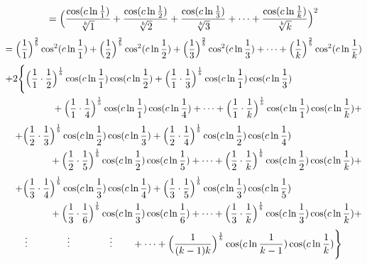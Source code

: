 \documentclass{amsart}
\begin{document}
	\[ = \Bigl( \frac{\cos({c\ln \frac{1}{1}})}{\sqrt[b]{1}} + \frac{\cos({c\ln \frac{1}{2}})}{\sqrt[b]{2}} + \frac{\cos({c\ln \frac{1}{3}})}{\sqrt[b]{3}} + \dots + \frac{\cos({c\ln \frac{1}{k}})}{\sqrt[b]{k}} \Bigr)^2 \]
	\[ = \Bigl( \frac{1}{1} \Bigr)^{\frac2b}\cos^2({c \ln \frac{1}{1}}) + \Bigl( \frac{1}{2} \Bigr)^{\frac2b}\cos^2({c \ln \frac{1}{2}}) + \Bigl( \frac{1}{3} \Bigr)^{\frac2b}\cos^2({c \ln \frac{1}{3}}) + \dots + \Bigl( \frac{1}{k} \Bigr)^{\frac2b}\cos^2({c \ln \frac{1}{k}}) \]
	\[
	\begin{aligned}
		+2\Biggl\{ \Bigl( \frac{1}{1} \cdot \frac{1}{2}& \Bigr)^\frac1b \cos(c \ln \frac{1}{1}) \cos(c \ln \frac{1}{2}) + \Bigl( \frac{1}{1} \cdot \frac{1}{3} \Bigr)^\frac1b \cos(c \ln \frac{1}{1}) \cos(c \ln \frac{1}{3}) \\ 
		& + \Bigl( \frac{1}{1} \cdot \frac{1}{4} \Bigr)^\frac1b \cos(c \ln \frac{1}{1}) \cos(c \ln \frac{1}{4}) + \dots + \Bigl( \frac{1}{1} \cdot \frac{1}{k} \Bigr)^\frac1b \cos(c \ln \frac{1}{1}) \cos(c \ln \frac{1}{k}) + \\ 		
	\end{aligned}
	\]
	\[
	\begin{aligned}
		\quad + \Bigl( \frac{1}{2} \cdot \frac{1}{3}& \Bigr)^\frac1b \cos(c \ln \frac{1}{2}) \cos(c \ln \frac{1}{3}) + \Bigl( \frac{1}{2} \cdot \frac{1}{4} \Bigr)^\frac1b \cos(c \ln \frac{1}{2}) \cos(c \ln \frac{1}{4}) \\ 
		& + \Bigl( \frac{1}{2} \cdot \frac{1}{5} \Bigr)^\frac1b \cos(c \ln \frac{1}{2}) \cos(c \ln \frac{1}{5}) + \dots + \Bigl( \frac{1}{2} \cdot \frac{1}{k} \Bigr)^\frac1b \cos(c \ln \frac{1}{2}) \cos(c \ln \frac{1}{k}) + \\ 		
	\end{aligned}
	\]
	\[
	\begin{aligned}
		\quad + \Bigl( \frac{1}{3} \cdot \frac{1}{4}& \Bigr)^\frac1b \cos(c \ln \frac{1}{3}) \cos(c \ln \frac{1}{4}) + \Bigl( \frac{1}{3} \cdot \frac{1}{5} \Bigr)^\frac1b \cos(c \ln \frac{1}{3}) \cos(c \ln \frac{1}{5}) \\ 
		& + \Bigl( \frac{1}{3} \cdot \frac{1}{6} \Bigr)^\frac1b \cos(c \ln \frac{1}{3}) \cos(c \ln \frac{1}{6}) + \dots + \Bigl( \frac{1}{3} \cdot \frac{1}{k} \Bigr)^\frac1b \cos(c \ln \frac{1}{3}) \cos(c \ln \frac{1}{k}) + \\ 		
	\end{aligned}
	\]
	\[
	\begin{aligned}
		\vdots \qquad\qquad \vdots \qquad\qquad \vdots \qquad + \dots + \Bigl( \frac{1}{(k-1)k} \Bigr)^\frac1b \cos(c \ln \frac{1}{k-1}) \cos(c \ln \frac{1}{k}) \Biggr\}
	\end{aligned}
	\]
	\[\]
	
\end{document}

